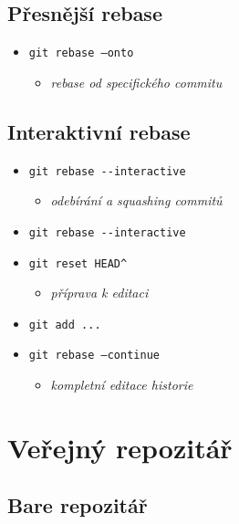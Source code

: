 \documentclass[10pt,twocolumn]{article}
\begin{document}
\subsection{Přesnější rebase}

\begin{itemize}
	\item \texttt{git rebase --onto}
	\begin{itemize} \item \textit{rebase od specifického commitu} \end{itemize}
\end{itemize}

\subsection{Interaktivní rebase}

\begin{itemize}
	\item \texttt{git rebase {-}{-}interactive}
	\begin{itemize} \item \textit{odebírání a squashing commitů} \end{itemize}
	\item \texttt{git rebase {-}{-}interactive}
	\item \texttt{git reset HEAD\^{ }}
	\begin{itemize} \item \textit{příprava k editaci} \end{itemize}
	\item \texttt{git add ...}
	\item \texttt{git rebase --continue}
	\begin{itemize} \item \textit{kompletní editace historie} \end{itemize}
\end{itemize}

\section{Veřejný repozitář}
\subsection{Bare repozitář}
\end{document}
